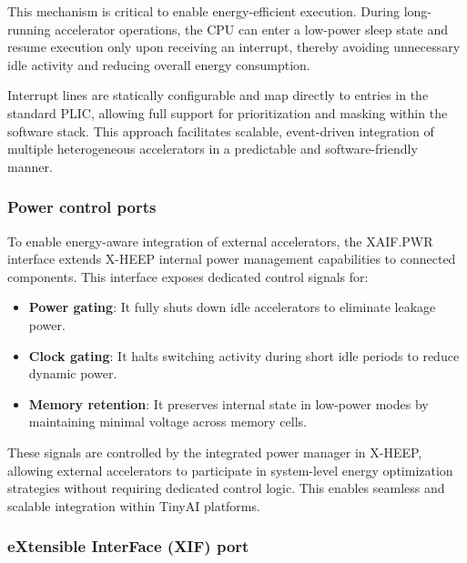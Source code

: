                 This mechanism is critical to enable energy-efficient execution. During long-running accelerator operations, the CPU can enter a low-power sleep state and resume execution only upon receiving an interrupt, thereby avoiding unnecessary idle activity and reducing overall energy consumption.
                
                Interrupt lines are statically configurable and map directly to entries in the standard PLIC, allowing full support for prioritization and masking within the software stack. This approach facilitates scalable, event-driven integration of multiple heterogeneous accelerators in a predictable and software-friendly manner.
            
            \subsubsection*{Power control ports}
                
                To enable energy-aware integration of external accelerators, the XAIF.PWR interface extends \mbox{X-HEEP} internal power management capabilities to connected components. This interface exposes dedicated control signals for:
                
                \vspace{-1em}
                \begin{itemize}
                    \item \textbf{Power gating}: It fully shuts down idle accelerators to eliminate leakage power.
                    \item \textbf{Clock gating}: It halts switching activity during short idle periods to reduce dynamic power.
                    \item \textbf{Memory retention}: It preserves internal state in low-power modes by maintaining minimal voltage across memory cells.
                \end{itemize}
                \vspace{-1em}
                
                These signals are controlled by the integrated power manager in \mbox{X-HEEP}, allowing external accelerators to participate in system-level energy optimization strategies without requiring dedicated control logic. This enables seamless and scalable integration within TinyAI platforms.
            
            \subsubsection*{eXtensible InterFace (XIF) port}
            
